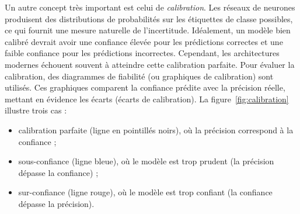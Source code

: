 \documentclass[a4paper,french,bookmarks,12pt]{article}
\begin{document}
    Un autre concept très important est celui de \emph{calibration}. Les réseaux de neurones produisent des distributions de probabilités sur les étiquettes de classe possibles, ce qui fournit une mesure naturelle de l'incertitude. Idéalement, un modèle bien calibré devrait avoir une confiance élevée pour les prédictions correctes et une faible confiance pour les prédictions incorrectes. Cependant, les architectures modernes échouent souvent à atteindre cette calibration parfaite. Pour évaluer la calibration, des diagrammes de fiabilité (ou graphiques de calibration) sont utilisés. Ces graphiques comparent la confiance prédite avec la précision réelle, mettant en évidence les écarts (écarts de calibration). La figure~\ref{fig:calibration} illustre trois cas :
    \begin{widetext}    
        \begin{minipage}{0.45\linewidth}
            \label{fig:calibration}
        \end{minipage}
        \hfill
        \begin{minipage}{0.52\linewidth}
            \begin{itemize}
                \item calibration parfaite (ligne en pointillés noirs), où la précision correspond à la confiance ;
                \item sous-confiance (ligne bleue), où le modèle est trop prudent (la précision dépasse la confiance) ;
                \item sur-confiance (ligne rouge), où le modèle est trop confiant (la confiance dépasse la précision).
            \end{itemize}
        \end{minipage}
    \end{widetext}
\end{document}
